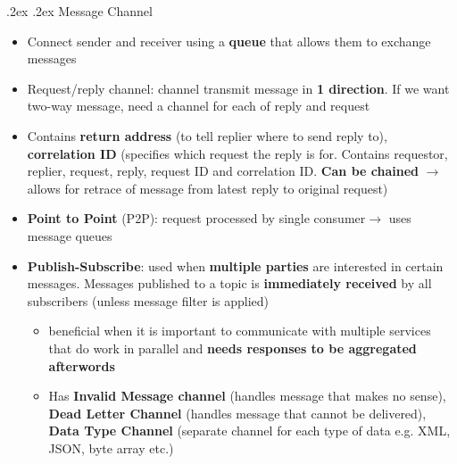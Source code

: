 \documentclass[10pt,landscape,a4paper]{article}
\makeatletter
\renewcommand{\subsubsection}{\@startsection{subsubsection}{1}{0mm}%
	{.2ex}%
	{.2ex}%
	{\rmfamily\bfseries}}
\makeatother
\begin{document}
\begin{multicols*}{4}
		\subsubsection{Message Channel}
		\begin{itemize}
			\item Connect sender and receiver using a \textbf{queue} that allows them to exchange messages
			\item Request/reply channel: channel transmit message in \textbf{1 direction}. If we want two-way message, need a channel for each of reply and request
			\item Contains \textbf{return address} (to tell replier where to send reply to), \textbf{correlation ID} (specifies which request the reply is for. Contains requestor, replier, request, reply, request ID and correlation ID. \textbf{Can be chained} $\rightarrow$ allows for retrace of message from latest reply to original request)
			\item \textbf{Point to Point} (P2P): request processed by single consumer$\rightarrow$ uses message queues
			\item \textbf{Publish-Subscribe}: used when \textbf{multiple parties} are interested in certain messages. Messages published to a topic is \textbf{immediately received} by all subscribers (unless message filter is applied)
			\begin{itemize}
				\item beneficial when it is important to communicate with multiple services that do work in parallel and \textbf{needs responses to be aggregated afterwords}
				\item Has \textbf{Invalid Message channel} (handles message that makes no sense), \textbf{Dead Letter Channel} (handles message that cannot be delivered), \textbf{Data Type Channel} (separate channel for each type of data e.g. XML, JSON, byte array etc.)
			\end{itemize}
		\end{itemize}

\end{multicols*}
\end{document}
